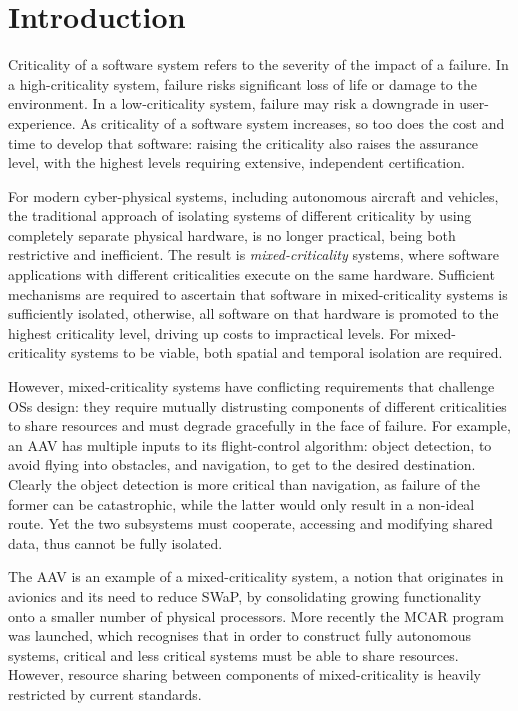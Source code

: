 \chapter{Introduction}

Criticality of a software system refers to the severity of the impact of a failure.
In a high-criticality system, failure risks significant loss of life or damage to the environment.
In a low-criticality system, failure may risk a downgrade in user-experience.
As criticality of a software system increases, so too does the cost and time to develop that
software: raising the criticality also raises the assurance level, with the highest levels requiring
extensive, independent certification.

For modern cyber-physical systems, including autonomous aircraft and vehicles, the traditional
approach of isolating systems of different criticality by using completely separate physical
hardware, is no
longer practical, being both restrictive and inefficient.
The result is \emph{mixed-criticality} systems, where software applications with different criticalities
execute on the same hardware. Sufficient mechanisms are required to ascertain that software in
mixed-criticality systems  is sufficiently isolated, otherwise, all software on that hardware is
promoted
to the highest criticality level, driving up costs to impractical levels. For mixed-criticality
systems to be
viable, both spatial and temporal isolation are required.

However, mixed-criticality systems have conflicting requirements that challenge \glspl{OS} design:
they require mutually distrusting components of different criticalities to share resources and must
degrade gracefully in the face of failure.  For example, an \gls{AAV} has multiple inputs to its
flight-control algorithm: object detection, to avoid flying into obstacles, and navigation, to get
to the desired destination.  Clearly the object detection is more critical than navigation, as
failure of the former can be catastrophic, while the latter would only result in a non-ideal route.
Yet the two subsystems must cooperate, accessing and modifying shared data, thus cannot be fully
isolated.

The \gls{AAV} is an example of a mixed-criticality system, a notion that originates in avionics and its
need to reduce \gls{SWaP}, by consolidating growing functionality onto a smaller
number of physical processors. More recently the
\gls{MCAR}\citep{Barhorst_BBHPSSSSU_09} program was launched, which recognises that in order to
construct fully autonomous systems, critical and less critical systems must be able to share
resources. However, resource sharing between components of mixed-criticality is heavily restricted by current
standards.

